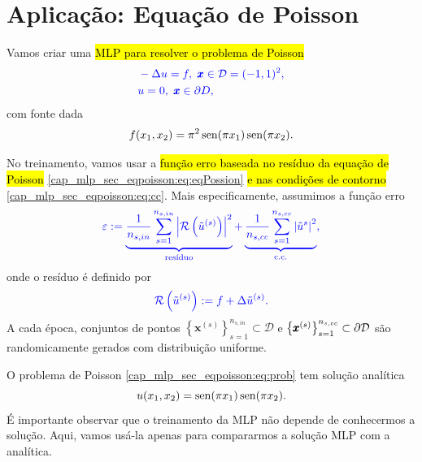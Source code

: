 \section{Aplicação: Equação de Poisson}\label{cap_mlp_sec_eqpoisson}

Vamos criar uma \hl{MLP para resolver o problema de Poisson}{\poisson}
\begin{subequations}\label{cap_mlp_sec_eqlaplace:eq:prob}
  \begin{align}
    &\color{blue}-\Delta u = f, ~\pmb{x}\in \mathcal{D} = (-1, 1)^2,\label{cap_mlp_sec_eqpoisson:eq:eqPossion}\\
    &\color{blue}u = 0, ~\pmb{x}\in\partial D,\label{cap_mlp_sec_eqpoisson:eq:cc}
  \end{align}
\end{subequations}
com fonte dada
\begin{equation}
  f(x_1, x_2) = \pi^2\operatorname{sen}(\pi x_1)\operatorname{sen}(\pi x_2).
\end{equation}

No treinamento, vamos usar a \hl{função erro baseada no resíduo da equação de Poisson} \eqref{cap_mlp_sec_eqpoisson:eq:eqPossion} \hl{e nas condições de contorno} \eqref{cap_mlp_sec_eqpoisson:eq:cc}. Mais especificamente, assumimos a função erro
\begin{equation}\color{blue}\varepsilon := \underbrace{\frac{1}{n_{s,in}}\sum_{s=1}^{n_{s,in}} \left|\mathcal{R}\left(\tilde{u}^{(s)}\right)\right|^2}_{\text{resíduo}} + \underbrace{\frac{1}{n_{s,cc}}\sum_{s=1}^{n_{s,cc}} \left|\tilde{u}^{s}\right|^2}_{\text{c.c.}},
\end{equation}
onde o resíduo é definido por
\begin{equation}\color{blue}\mathcal{R}\left(\tilde{u}^{(s)}\right) := f + \Delta\tilde{u}^{(s)}.
\end{equation}
A cada época, conjuntos de pontos $\left\{\pmb{x}^{(s)}\right\}_{s=1}^{n_{s,in}}\subset\mathcal{D}$ e $\left\{\pmb{x}^{(s)}\right\}_{s=1}^{n_{s,cc}}\subset\partial\mathcal{D}$ são randomicamente gerados com distribuição uniforme.

\begin{obs}
  O problema de Poisson \eqref{cap_mlp_sec_eqpoisson:eq:prob} tem solução analítica
  \begin{equation}
    u(x_1, x_2) = \operatorname{sen}(\pi x_1)\operatorname{sen}(\pi x_2).
  \end{equation}
  É importante observar que o treinamento da MLP não depende de conhecermos a solução. Aqui, vamos usá-la apenas para compararmos a solução MLP com a analítica.
\end{obs}

